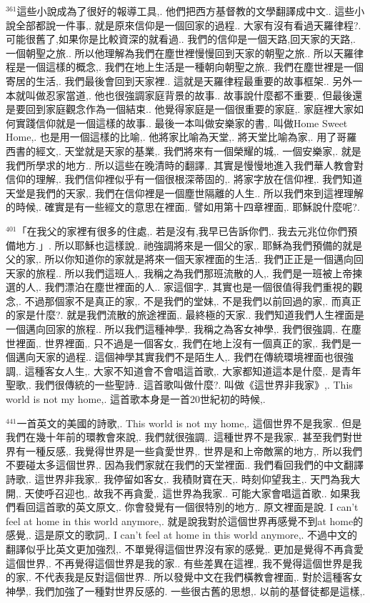 \documentclass{book}
\begin{document}
$^{361}$這些小說成為了很好的報導工具,.
他們把西方基督教的文學翻譯成中文..
這些小說全部都說一件事,.
就是原來信仰是一個回家的過程..
大家有沒有看過天羅律程?.
可能很舊了,如果你是比較資深的就看過..
我們的信仰是一個天路,回天家的天路,.
一個朝聖之旅..
所以他理解為我們在塵世裡慢慢回到天家的朝聖之旅..
所以天羅律程是一個這樣的概念,.
我們在地上生活是一種朝向朝聖之旅,.
我們在塵世裡是一個寄居的生活,.
我們最後會回到天家裡..
這就是天羅律程最重要的故事框架..
另外一本就叫做忍家當道,.
他也很強調家庭背景的故事..
故事說什麼都不重要,.
但最後還是要回到家庭觀念作為一個結束..
他覺得家庭是一個很重要的家庭,.
家庭裡大家如何實踐信仰就是一個這樣的故事..
最後一本叫做安樂家的書,.
叫做Home Sweet Home,.
也是用一個這樣的比喻,.
他將家比喻為天堂,.
將天堂比喻為家,.
用了哥羅西書的經文,.
天堂就是天家的基業,.
我們將來有一個榮耀的城,.
一個安樂家,.
就是我們所學求的地方..
所以這些在晚清時的翻譯,.
其實是慢慢地進入我們華人教會對信仰的理解,.
我們信仰裡似乎有一個很根深蒂固的,.
將家字放在信仰裡,.
我們知道天堂是我們的天家,.
我們在信仰裡是一個塵世隔離的人生..
所以我們來到這裡理解的時候,.
確實是有一些經文的意思在裡面,.
譬如用第十四章裡面,.
耶穌說什麼呢?.

$^{401}$「在我父的家裡有很多的住處,.
若是沒有,我早已告訴你們,.
我去元兆位你們預備地方.」.
所以耶穌也這樣說,.
祂強調將來是一個父的家,.
耶穌為我們預備的就是父的家,.
所以你知道你的家就是將來一個天家裡面的生活,.
我們正正是一個邁向回天家的旅程..
所以我們這班人,.
我稱之為我們那班流散的人,.
我們是一班被上帝揀選的人,.
我們漂泊在塵世裡面的人..
家這個字,.
其實也是一個很值得我們重視的觀念,.
不過那個家不是真正的家,.
不是我們的堂妹,.
不是我們以前回過的家,.
而真正的家是什麼?.
就是我們流散的旅途裡面,.
最終極的天家..
我們知道我們人生裡面是一個邁向回家的旅程..
所以我們這種神學,.
我稱之為客女神學,.
我們很強調,.
在塵世裡面,.
世界裡面,.
只不過是一個客女,.
我們在地上沒有一個真正的家,.
我們是一個邁向天家的過程..
這個神學其實我們不是陌生人,.
我們在傳統環境裡面也很強調,.
這種客女人生,.
大家不知道會不會唱這首歌,.
大家都知道這本是什麼,.
是青年聖歌,.
我們很傳統的一些聖詩..
這首歌叫做什麼?.
叫做《這世界非我家》,.
This world is not my home,.
這首歌本身是一首20世紀初的時候,.

$^{441}$一首英文的美國的詩歌,.
This world is not my home,.
這個世界不是我家..
但是我們在幾十年前的環教會來說,.
我們就很強調,.
這種世界不是我家,.
甚至我們對世界有一種反感,.
我覺得世界是一些貪愛世界,.
世界是和上帝敵黨的地方,.
所以我們不要碰太多這個世界,.
因為我們家就在我們的天堂裡面..
我們看回我們的中文翻譯詩歌,.
這世界非我家,.
我停留如客女,.
我積財寶在天,.
時刻仰望我主,.
天門為我大開,.
天使呼召迎也,.
故我不再貪愛,.
這世界為我家..
可能大家會唱這首歌..
如果我們看回這首歌的英文原文,.
你會發覺有一個很特別的地方,.
原文裡面是說.
I can't feel at home in this world anymore,.
就是說我對於這個世界再感覺不到at home的感覺,.
這是原文的歌詞,.
I can't feel at home in this world anymore,.
不過中文的翻譯似乎比英文更加強烈,.
不單覺得這個世界沒有家的感覺,.
更加是覺得不再貪愛這個世界,.
不再覺得這個世界是我的家..
有些差異在這裡,.
我不覺得這個世界是我的家,.
不代表我是反對這個世界..
所以發覺中文在我們橫教會裡面,.
對於這種客女神學,.
我們加強了一種對世界反感的.
一些很古舊的思想,.
以前的基督徒都是這樣,.
\end{document}
